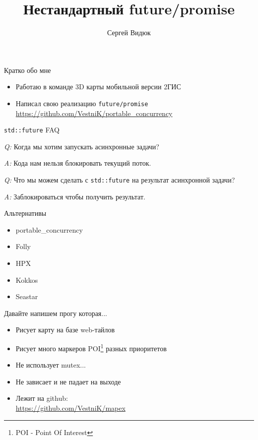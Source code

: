 \documentclass[aspectratio=169,hyperref={unicode},17pt]{beamer}
\title{Нестандартный future/promise}
\author{Сергей Видюк}
\date{}
\begin{document}
\begin{frame}
 \maketitle
\end{frame}

\begin{frame}[t]{Кратко обо мне}
 \begin{itemize}
  \item Работаю в команде 3D карты мобильной версии 2ГИС
  \item Написал свою реализацию \texttt{future/promise} {\footnotesize{\url{https://github.com/VestniK/portable_concurrency}}}
 \end{itemize}
\end{frame}

\begin{frame}[fragile,t]{\texttt{std::future} FAQ}

{\em Q:} Когда мы хотим запускать асинхронные задачи?

{\em A:} Кода нам нельзя блокировать текущий поток.

{\em Q:} Что мы можем сделать с \texttt{std::future} на результат асинхронной задачи?

{\em A:} Заблокироваться чтобы получить результат.
\end{frame}

\begin{frame}[fragile,t]{Альтернативы}
\begin{itemize}
  \item portable\_concurrency
  \item Folly
  \item HPX
  \item Kokkos
  \item Seastar
 \end{itemize}
\end{frame}

\begin{frame}[t]{Давайте напишем прогу которая...}
 \begin{itemize}
  \item Рисует карту на базе web-тайлов
  \item Рисует много маркеров POI\footnote{POI - Point Of Interest} разных приоритетов
  \item Не использует mutex...
  \item Не зависает и не падает на выходе
  \item Лежит на github: \\ \footnotesize{\url{https://github.com/VestniK/mapex}}
 \end{itemize}
\end{frame}
\end{document}
